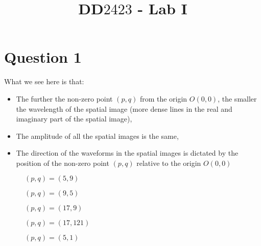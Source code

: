 \documentclass[12pt]{article}
\title{DD$2423$ - Lab I}
\date{}
\begin{document}
	\maketitle
  
  	\section{Question 1}
  		What we see here is that:
  
  		\begin{itemize}
 
  		\item The further the non-zero point $(p,q)$ from the origin $O(0,0)$, the smaller the wavelength of the spatial image 
  		(more dense lines in the real and imaginary part of the spatial image),
  
  		\item The amplitude of all the spatial images is the same,
  
  		\item The direction of the waveforms in the spatial images is dictated by the position of the non-zero point $(p,q)$ relative to the origin $O(0,0)$
  
  		\end{itemize}

	  	\begin{figure}[!htb]
			\centering
			\scalebox{0.7}{}
			\caption{$(p,q)=(5,9)$}
			\label{fig:59}
	  	\end{figure}
	  	
	  	\begin{figure}[!htb]
			\centering
			\scalebox{0.7}{}
			\caption{$(p,q)=(9,5)$}
			\label{fig:95}
	  	\end{figure}

	  	\begin{figure}[!htb]
			\centering
			\scalebox{0.7}{}
			\caption{$(p,q)=(17,9)$}
			\label{fig:179}
	  	\end{figure}
	  	
	  	\begin{figure}[!htb]
			\centering
			\scalebox{0.7}{}
			\caption{$(p,q)=(17,121)$}
			\label{fig:17121}
	  	\end{figure}
	  	
	  	\begin{figure}[!htb]
			\centering
			\scalebox{0.7}{}
			\caption{$(p,q)=(5,1)$}
			\label{fig:51}
	  	\end{figure}
	  	
\end{document}

